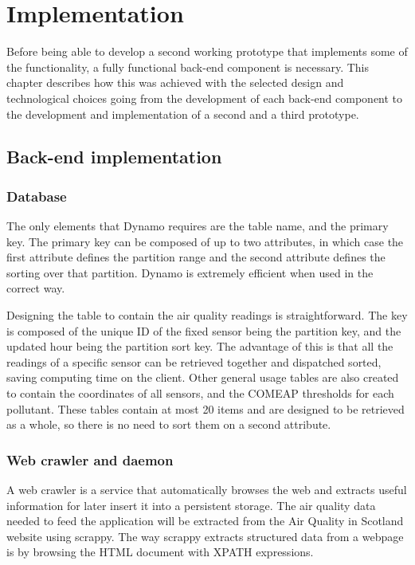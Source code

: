 \chapter{Implementation}
Before being able to develop a second working prototype that implements some of the functionality, a fully functional back-end component is necessary. This chapter describes how this was achieved with the selected design and technological choices going from the development of each back-end component to the development and implementation of a second and a third prototype.
\section{Back-end implementation}

\subsection{Database}
The only elements that Dynamo requires are the table name, and the primary key. The primary key can be composed of up to two attributes, in which case the first attribute defines the partition range and the second attribute defines the sorting over that partition. Dynamo is extremely efficient when used in the correct way. 

Designing the table to contain the air quality readings is straightforward. The key is composed of the unique ID of the fixed sensor being the partition key, and the updated hour being the partition sort key. The advantage of this is that all the readings of a specific sensor can be retrieved together and dispatched sorted, saving computing time on the client. Other general usage tables are also created to contain the coordinates of all sensors, and the COMEAP thresholds for each pollutant. These tables contain at most 20 items and are designed to be retrieved as a whole, so there is no need to sort them on a second attribute.

\subsection{Web crawler and daemon}
A web crawler is a service that automatically browses the web and extracts useful information for later insert it into a persistent storage. The air quality data needed to feed the application will be extracted from the Air Quality in Scotland website using scrappy. The way scrappy extracts structured data from a webpage is by browsing the HTML document with XPATH expressions. 

